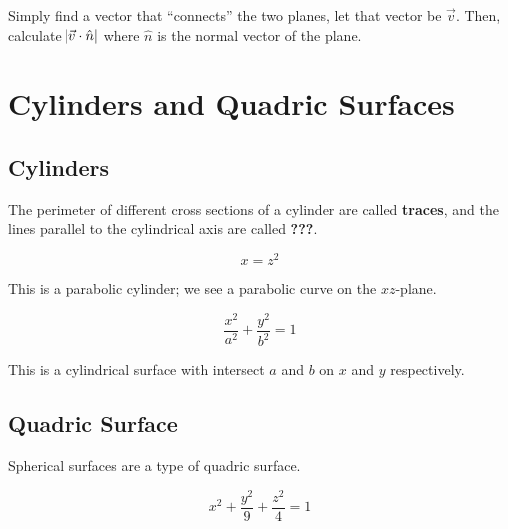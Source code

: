 \begin{sol}
	Simply find a vector that ``connects'' the two planes, let that vector be $\vec v$. Then, calculate $\abs{\vec v \cdot \hat n}$ where $\hat n$ is the normal vector of the plane.
\end{sol}

\section{Cylinders and Quadric Surfaces}

\subsection{Cylinders}

The perimeter of different cross sections of a cylinder are called \textbf{traces}, and the lines parallel to the cylindrical axis are called \textbf{???}.


\begin{example}
	\begin{equation}
		x = z^2
	\end{equation}

	This is a parabolic cylinder; we see a parabolic curve on the $xz$-plane.
\end{example}

\begin{example}
	\begin{equation}
		\frac{x^2}{a^2} + \frac{y^2}{b^2} = 1
	\end{equation}
	
	This is a cylindrical surface with intersect $a$ and $b$ on $x$ and $y$ respectively.
\end{example}

\subsection{Quadric Surface}

\begin{remark}
	Spherical surfaces are a type of quadric surface.
\end{remark}

\begin{example}[Ellipsoid]
	\begin{equation}
		x^2 + \frac{y^2}{9} + \frac{z^2}{4} = 1
	\end{equation}
\end{example}


